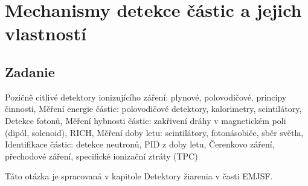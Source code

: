\documentclass[../../main.tex]{subfiles}
\begin{document}
\section{Mechanismy detekce částic a jejich vlastností}

\subsection{Zadanie}

Pozičně citlivé detektory ionizujícího záření: plynové, polovodičové, principy činnosti, Měření energie částic: polovodičové detektory, kalorimetry, scintilátory, Detekce fotonů, Měření hybnosti částic: zakřivení dráhy v magnetickém poli (dipól, solenoid), RICH, Měření doby letu: scintilátory, fotonásobiče, sběr světla, Identifikace částic: detekce neutronů, PID z doby letu, Čerenkovo záření, přechodové záření, specifické ionizační ztráty (TPC)


Táto otázka je spracovaná v kapitole Detektory žiarenia v časti EMJSF.
\end{document}
